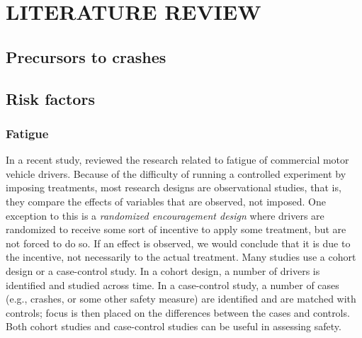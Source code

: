 \documentclass[12pt]{book}
\numberwithin{equation}{chapter}
\begin{document}
\hypertarget{literature-review}{%
\chapter{LITERATURE REVIEW}\label{literature-review}}

\hypertarget{precursors-to-crashes}{%
\section{Precursors to crashes}\label{precursors-to-crashes}}

\hypertarget{risk-factors}{%
\section{Risk factors}\label{risk-factors}}

\hypertarget{fatigue}{%
\subsection{Fatigue}\label{fatigue}}

In a recent study, \citet{stern2018Data} reviewed the research related to fatigue of commercial motor vehicle drivers. Because of the difficulty of running a controlled experiment by imposing treatments, most research designs are observational studies, that is, they compare the effects of variables that are observed, not imposed. One exception to this is a \emph{randomized encouragement design} where drivers are randomized to receive some sort of incentive to apply some treatment, but are not forced to do so. If an effect is observed, we would conclude that it is due to the incentive, not necessarily to the actual treatment. Many studies use a cohort design or a case-control study. In a cohort design, a number of drivers is identified and studied across time. In a case-control study, a number of cases (e.g., crashes, or some other safety measure) are identified and are matched with controls; focus is then placed on the differences between the cases and controls. Both cohort studies and case-control studies can be useful in assessing safety.
\end{document}
